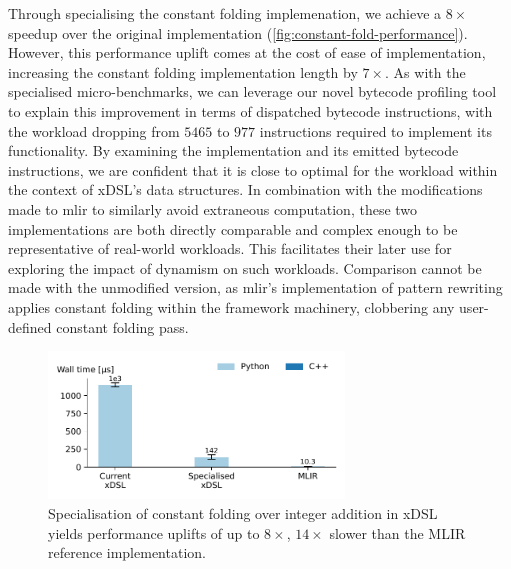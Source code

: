 Through specialising the constant folding implemenation, we achieve a $8\times$ speedup over the original implementation (\autoref{fig:constant-fold-performance}).
However, this performance uplift comes at the cost of ease of implementation, increasing the constant folding implementation length by $7\times$.
As with the specialised micro-benchmarks, we can leverage our novel bytecode profiling tool to explain this improvement in terms of dispatched bytecode instructions, with the workload dropping from $5465$ to $977$ instructions required to implement its functionality.
By examining the implementation and its emitted bytecode instructions, we are confident that it is close to optimal for the workload within the context of xDSL's data structures.
In combination with the modifications made to \ac{mlir} to similarly avoid extraneous computation, these two implementations are both directly comparable and complex enough to be representative of real-world workloads.
This facilitates their later use for exploring the impact of dynamism on such workloads.
Comparison cannot be made with the unmodified version, as \ac{mlir}'s implementation of pattern rewriting applies constant folding within the framework machinery, clobbering any user-defined constant folding pass.


\begin{figure}[H]
    \centering
    \includegraphics[width=0.7\textwidth]{images/specialising_optimising_xdsl_rewriting/constant_performance.pdf}
    \caption{Specialisation of constant folding over integer addition in xDSL yields performance uplifts of
up to $8\times$, $14\times$ slower than the MLIR reference
implementation.}
    \label{fig:constant-fold-performance}
\end{figure}

